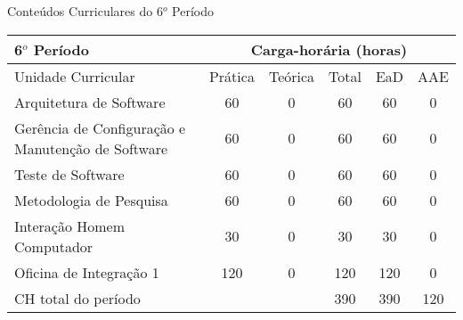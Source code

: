 \begin{quadro}[ht!]
\centering
\caption{Conteúdos Curriculares do 6$^o$ Período}\label{qua:periodo6}
\begin{tabular}{|p{8.0cm}|c|c|c|c|c|}
\hline
\rowcolor{blue1} 6$^o$ Período & \multicolumn{5}{|c|}{\centering Carga-horária (horas)} \\ \hline
\rowcolor{blue1} Unidade Curricular & Prática & Teórica & Total & EaD & AAE \\ \hline
Arquitetura de Software & 60 & 0 & 60 & 60	&	0 \\	\hline
Gerência de Configuração e Manutenção de Software & 60 & 0 & 60 & 60	&	0 \\	\hline
Teste de Software  & 60 & 0 & 60 & 60	&	0 \\	\hline
Metodologia de Pesquisa & 60 & 0 & 60 & 60	&	0 \\	\hline
Interação Homem Computador & 30 & 0 & 30 & 30	&	0 \\	\hline
Oficina de Integração 1 & 120 & 0 & 120 & 120	&	0 \\	\hline
CH total do período & \multicolumn{2}{p{3.3cm}|}{\cellcolor{blue1}} & 390 & 390	&	120 \\ \hline
 \end{tabular} \end{quadro}